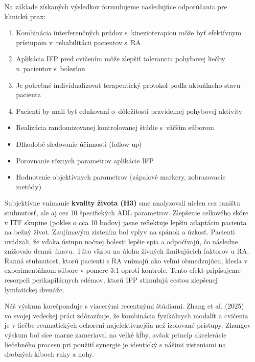 Na základe získaných výsledkov formulujeme nasledujúce odporúčania pre klinickú prax:

\begin{enumerate}
    \item Kombinácia interferenčných prúdov s~kinezioterapiou môže byť efektívnym prístupom v~rehabilitácii pacientov s~RA
    
    \item Aplikácia IFP pred cvičením môže zlepšiť toleranciu pohybovej liečby u~pacientov s~bolesťou
    
    \item Je potrebné individualizovať terapeutický protokol podľa aktuálneho stavu pacienta
    
    \item Pacienti by mali byť edukovaní o~dôležitosti pravidelnej pohybovej aktivity
\end{enumerate}

\begin{itemize}
    \item Realizácia randomizovanej kontrolovanej štúdie s~väčším súborom
    \item Dlhodobé sledovanie účinnosti (follow-up)
    \item Porovnanie rôznych parametrov aplikácie IFP
    \item Hodnotenie objektívnych parametrov (zápalové markery, zobrazovacie metódy)
\end{itemize}

\clearpage

Subjektívne vnímanie \textbf{kvality života (H3)} sme analyzovali nielen cez raništu stuh​nutosť, ale aj cez 10 špecifických ADL parametrov. Zlepšenie celkového skóre v ITF skupine (pokles o cca 10 bodov) jasne reflektuje lepšiu adaptáciu pacienta na bežný život. Zaujímavým zistením bol vplyv na spánok a úzkosť. Pacienti uvádzali, že vďaka ústupu nočnej bolesti lepšie spia a odpočívajú, čo následne znižovalo dennú únavu. Túto väzbu na úlohu živ​ných limitujúcich faktorov u RA. Ranná stuhnutosť, ktorú pacienti s RA vnímajú ako veľmi obmedz​ujúcu, klesla v experimentálnom súbore v pomere 3:1 oproti kontrole. Tento efekt pripísujeme resorpcii perikapilárnych edémov, ktorú IFP stimulujú cestou zlepšenej lymfatickej drenáže.

Náš výskum korešponduje s viacerými recentnými štúdiami. Zhang et al. (2025) vo svojej vedeckej práci zdôrazňuje, že kombinácia fyzikálnych modalít a cvičenia je v liečbe reumatických ochorení najefektívnejšia než izolované prístupy. Zhangov výskum bol síce marne zameriaval na veľké kĺby, avšak princíp akcelerácie liečebného procesu pri použití synergie je identický s nášimi zisteniami na drobných kĺboch ruky a nohy.

